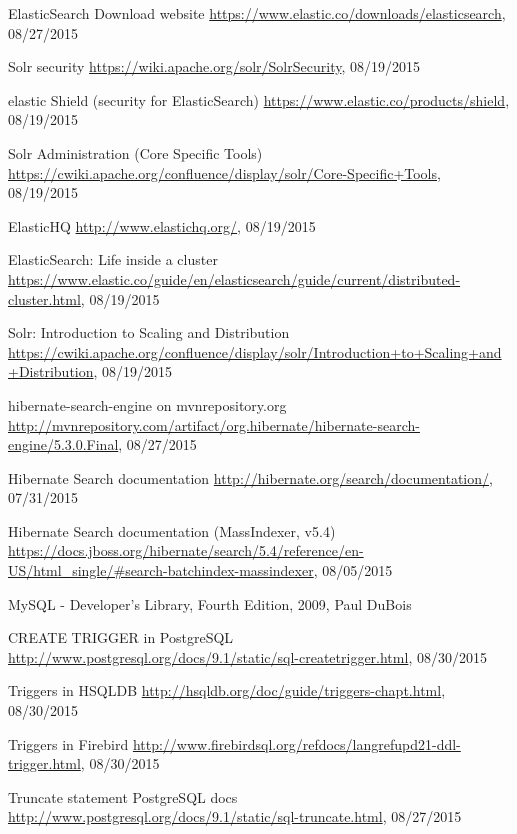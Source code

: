 \begin{thebibliography}{100}
	 ElasticSearch Download website
	\url{https://www.elastic.co/downloads/elasticsearch}, 08/27/2015

	 Solr security
	\url{https://wiki.apache.org/solr/SolrSecurity}, 08/19/2015

	 elastic Shield (security for ElasticSearch)
	\url{https://www.elastic.co/products/shield}, 08/19/2015

	 Solr Administration (Core Specific Tools)
	\url{https://cwiki.apache.org/confluence/display/solr/Core-Specific+Tools}, 08/19/2015

	 ElasticHQ
	\url{http://www.elastichq.org/}, 08/19/2015

	 ElasticSearch: Life inside a cluster
	\url{https://www.elastic.co/guide/en/elasticsearch/guide/current/distributed-cluster.html}, 08/19/2015

	 Solr: Introduction to Scaling and Distribution
	\url{https://cwiki.apache.org/confluence/display/solr/Introduction+to+Scaling+and+Distribution}, 08/19/2015

	 hibernate-search-engine on mvnrepository.org
	\url{http://mvnrepository.com/artifact/org.hibernate/hibernate-search-engine/5.3.0.Final}, 08/27/2015

	 Hibernate Search documentation
	\url{http://hibernate.org/search/documentation/}, 07/31/2015

	 Hibernate Search documentation (MassIndexer, v5.4)
	\url{https://docs.jboss.org/hibernate/search/5.4/reference/en-US/html_single/#search-batchindex-massindexer}, 08/05/2015

	 MySQL - Developer's Library, Fourth Edition, 2009, Paul DuBois

	 CREATE TRIGGER in PostgreSQL
	\url{http://www.postgresql.org/docs/9.1/static/sql-createtrigger.html}, 08/30/2015

	 Triggers in HSQLDB
	\url{http://hsqldb.org/doc/guide/triggers-chapt.html}, 08/30/2015

	 Triggers in Firebird
	\url{http://www.firebirdsql.org/refdocs/langrefupd21-ddl-trigger.html}, 08/30/2015

	 Truncate statement PostgreSQL docs
	\url{http://www.postgresql.org/docs/9.1/static/sql-truncate.html}, 08/27/2015


\end{thebibliography}
